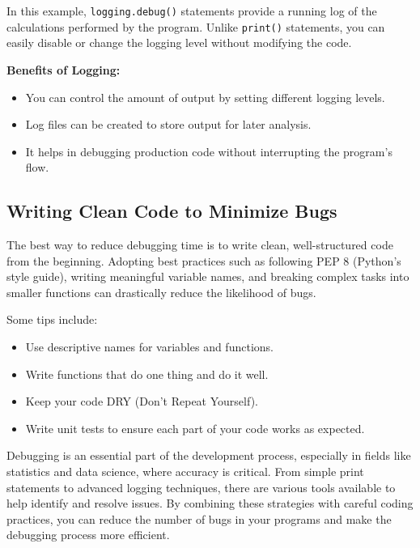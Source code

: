 \documentclass[
  letterpaper,
  DIV=11,
  numbers=noendperiod]{scrreprt}
\providecommand{\tightlist}{%
  \setlength{\itemsep}{0pt}\setlength{\parskip}{0pt}}\usepackage{longtable,booktabs,array}
\begin{document}
In this example, \texttt{logging.debug()} statements provide a running
log of the calculations performed by the program. Unlike
\texttt{print()} statements, you can easily disable or change the
logging level without modifying the code.

\textbf{Benefits of Logging:}

\begin{itemize}
\tightlist
\item
  You can control the amount of output by setting different logging
  levels.
\item
  Log files can be created to store output for later analysis.
\item
  It helps in debugging production code without interrupting the
  program's flow.
\end{itemize}

\hypertarget{writing-clean-code-to-minimize-bugs}{%
\subsection{Writing Clean Code to Minimize
Bugs}\label{writing-clean-code-to-minimize-bugs}}

The best way to reduce debugging time is to write clean, well-structured
code from the beginning. Adopting best practices such as following PEP 8
(Python's style guide), writing meaningful variable names, and breaking
complex tasks into smaller functions can drastically reduce the
likelihood of bugs.

Some tips include:

\begin{itemize}
\tightlist
\item
  Use descriptive names for variables and functions.
\item
  Write functions that do one thing and do it well.
\item
  Keep your code DRY (Don't Repeat Yourself).
\item
  Write unit tests to ensure each part of your code works as expected.
\end{itemize}

Debugging is an essential part of the development process, especially in
fields like statistics and data science, where accuracy is critical.
From simple print statements to advanced logging techniques, there are
various tools available to help identify and resolve issues. By
combining these strategies with careful coding practices, you can reduce
the number of bugs in your programs and make the debugging process more
efficient.
\end{document}
